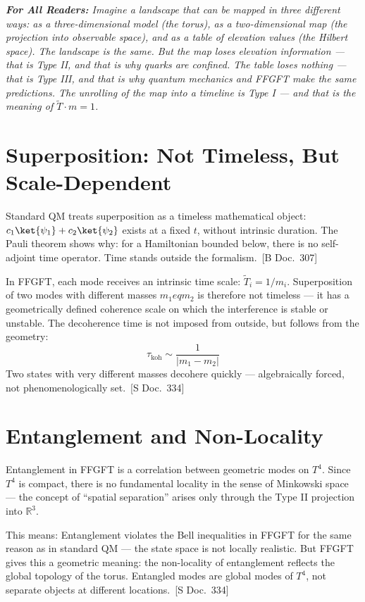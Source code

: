 \documentclass[11pt,oneside]{book}
\newcommand{\status}[1]{\penalty10000\,{\scriptsize\textcolor{gray!60}{[#1]}}}
\newenvironment{laierspur}{%
  \par\vspace{4pt}%
  \noindent\small\itshape\color{blue!60!black}%
  \textbf{For All Readers:}\enspace\ignorespaces}{%
  \par\vspace{4pt}\normalsize\normalfont\normalcolor}
\begin{document}
\begin{laierspur}
Imagine a landscape that can be mapped in three different ways: as a
three-dimensional model (the torus), as a two-dimensional map (the projection
into observable space), and as a table of elevation values (the Hilbert
space). The landscape is the same. But the map loses elevation information —
that is Type II, and that is why quarks are confined. The table loses
nothing — that is Type III, and that is why quantum mechanics and FFGFT make
the same predictions. The unrolling of the map into a timeline is Type I —
and that is the meaning of $\tilde{T}\cdot m = 1$.
\end{laierspur}

\section*{Superposition: Not Timeless, But Scale-Dependent}

Standard QM treats superposition as a timeless mathematical object:
$c_1\ket{\psi_1} + c_2\ket{\psi_2}$ exists at a fixed $t$, without intrinsic
duration. The Pauli theorem shows why: for a Hamiltonian bounded below,
there is no self-adjoint time operator. Time stands outside the formalism. \status{B Doc.~307}

In FFGFT, each mode receives an intrinsic time scale: $\tilde{T}_i = 1/m_i$.
Superposition of two modes with different masses $m_1 
eq m_2$ is therefore
not timeless — it has a geometrically defined coherence scale on which the
interference is stable or unstable. The decoherence time is not imposed from
outside, but follows from the geometry:
\[
  \tau_\text{koh} \sim \frac{1}{|m_1 - m_2|}
\]
Two states with very different masses decohere quickly — algebraically
forced, not phenomenologically set. \status{S Doc.~334}

\section*{Entanglement and Non-Locality}

Entanglement in FFGFT is a correlation between geometric modes on $T^4$.
Since $T^4$ is compact, there is no fundamental locality in the sense of
Minkowski space — the concept of \enquote{spatial separation} arises only through
the Type II projection into $\mathbb{R}^3$.

This means: Entanglement violates the Bell inequalities in FFGFT for the
same reason as in standard QM — the state space is not locally realistic.
But FFGFT gives this a geometric meaning: the non-locality of entanglement
reflects the global topology of the torus. Entangled modes are global modes
of $T^4$, not separate objects at different locations. \status{S Doc.~334}
\end{document}
